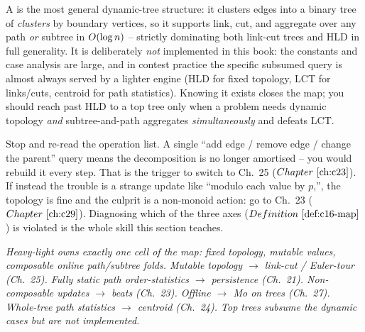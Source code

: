 \begin{notebox}
A  is the most general dynamic-tree structure: it clusters edges into a binary tree of \emph{clusters} by boundary vertices, so it supports link, cut, and aggregate over any path \emph{or} subtree in \(O(\log n)\) -- strictly dominating both link-cut trees and HLD in full generality.  It is deliberately \emph{not} implemented in this book: the constants and case analysis are large, and in contest practice the specific subsumed query is almost always served by a lighter engine (HLD for fixed topology, LCT for links/cuts, centroid for path statistics).  Knowing it exists closes the map; you should reach past HLD to a top tree only when a problem needs dynamic topology \emph{and} subtree-and-path aggregates \emph{simultaneously} and defeats LCT.
\end{notebox}

\begin{stuckbox}
Stop and re-read the operation list.  A single ``add edge / remove edge / change the parent'' query means the decomposition is no longer amortised -- you would rebuild it every step.  That is the trigger to switch to Ch.~25 (\(\chref{c23}\)).  If instead the trouble is a strange update like ``modulo each value by \(p\),'', the topology is fine and the culprit is a non-monoid action: go to Ch.~23 (\(\chref{c29}\)).  Diagnosing which of the three axes (\(\defref{c16-map}\)) is violated is the whole skill this section teaches.
\end{stuckbox}

\begin{recallbox}
\emph{Heavy-light owns exactly one cell of the map: fixed topology, mutable values, composable online path/subtree folds.  Mutable topology \(\to\) link-cut / Euler-tour (Ch.~25).  Fully static path order-statistics \(\to\) persistence (Ch.~21).  Non-composable updates \(\to\) beats (Ch.~23).  Offline \(\to\) Mo on trees (Ch.~27).  Whole-tree path statistics \(\to\) centroid (Ch.~24).  Top trees subsume the dynamic cases but are not implemented.}
\end{recallbox}
